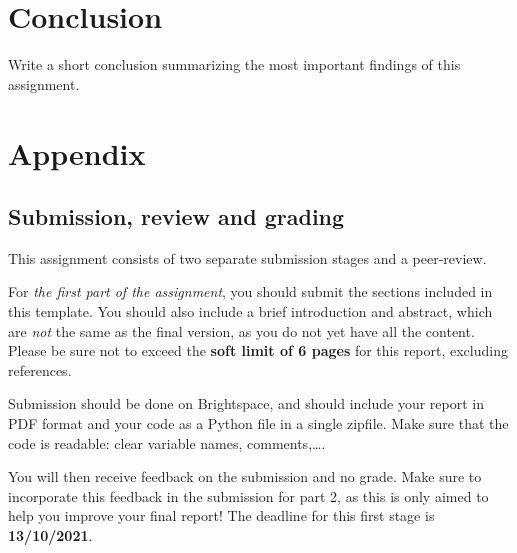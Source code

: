 \documentclass[runningheads]{llncs}
\begin{document}
\section{Conclusion}
Write a short conclusion summarizing the most important findings of this assignment. 

\appendix
\section{Appendix}
\subsection{Submission, review and grading}\label{sec:submission}
This assignment consists of two separate submission stages and a peer-review.

For \emph{the first part of the assignment}, you should submit the sections included in this template. You should also include a brief introduction and abstract, which are \emph{not} the same as the final version, as you do not yet have all the content. Please be sure not to exceed the \textbf{soft limit of 6 pages} for this report, excluding references.

Submission should be done on Brightspace, and should include your report in PDF format and your code as a Python file in a single zipfile.  Make sure that the code is readable: clear variable names, comments,\dots. 

You will then receive feedback on the submission and no grade. Make sure to incorporate this feedback in the submission for part 2, as this is only aimed to help you improve your final report! The deadline for this first stage is \textbf{13/10/2021}. 




\end{document}
